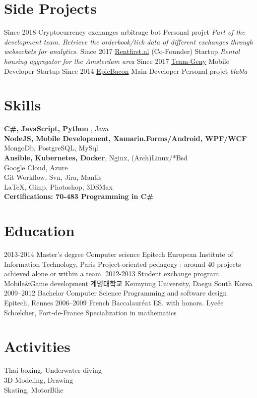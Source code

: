 \documentclass{emonides-cv}
\begin{document}
\section{Side Projects}
\begin{entrylist}
  \entry
    {Since  2018}
    {Cryptocurrency exchanges arbitrage bot {\normalfont }}
    {Personal projet}
    {\emph{Part of the development team. Retrieve the orderbook/tick data of different exchanges through websockets for analytics. }}
  \entry
    {Since  2017}
    {\href{https://www.Rentfirst.nl/}{Rentfirst.nl} {\normalfont  (Co-Founder)}}
    {Startup}
    {\emph{Rental housing aggregator for the Amsterdam area}}
  \entry
    {Since  2017}
    {\href{http://www.teamgeny.com/}{Team-Geny} {\normalfont Mobile Developer}}
    {Startup}
    {\emph{}}
  \entry
    {Since  2014}
    {\href{https://play.google.com/store/apps/developer?id=EpicBacon}{EpicBacon} {\normalfont Main-Developer}}
    {Personal projet}
    {\emph{blabla}}
  
\end{entrylist}


\section{Skills}
  \normalsize
  \textbf{C\#, JavaScript, Python} , Java\\
  \textbf { NodeJS, Mobile Development, Xamarin.Forms/Android, WPF/WCF}  \\
  MongoDb, PostgreSQL, MySql\\
  \textbf { Ansible, Kubernetes, Docker}, Nginx, (Arch)Linux/*Bsd \\
  Google Cloud, Azure \\
  Git Workflow, Svn, Jira, Mantis\\
  \LaTeX, Gimp, Photoshop, 3DSMax\\
  \textbf { Certifications: 70-483 Programming in C\# }

\section{Education}
\begin{entrylist}
  \entry
    {2013-2014}
    {Master's degree {\normalfont Computer science }}
    {Epitech European Institute of Information Technology, Paris} {Project-oriented pedagogy : around 40 projects achieved alone or within a team.}
  \entry
    {2012-2013}
    {Student exchange program  {\normalfont  Mobile\&Game development }}
    { {\sffamily 계명대학교} Keimyung University, Daegu South Korea} {}
  \entry
    {2009–2012}
    {Bachelor  {\normalfont Computer Science Programming and software design}}
    {Epitech, Rennes} {}
  \entry
    {2006–2009}
    {French Baccalauréat ES. {\normalfont with honors. }}
    {Lycée Schœlcher, Fort-de-France} { Specialization in mathematics }
\end{entrylist}

\section{Activities}
  Thai boxing, Underwater diving\\
  3D Modeling, Drawing\\
  Skating, MotorBike
  
\end{document}
